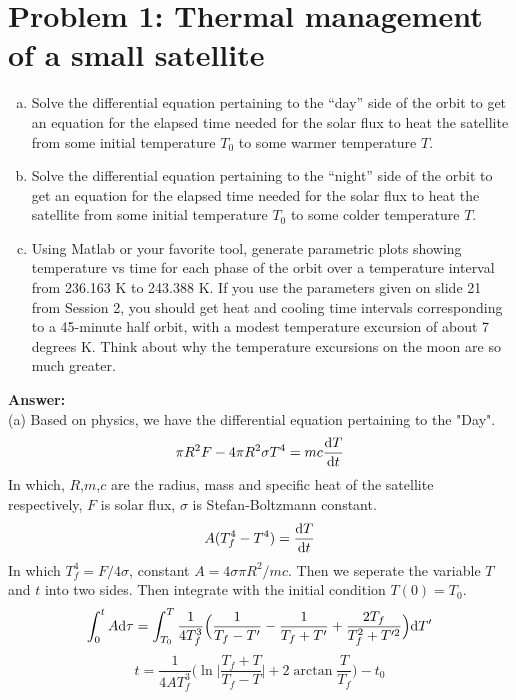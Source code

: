 \documentclass[a4paper]{article}
\begin{document}
\section{Problem 1: Thermal management of a small satellite}
\begin{enumerate}[(a)]
\item Solve the differential equation pertaining to the “day” side of the orbit to get an equation for the elapsed time needed for the solar flux to heat the satellite from some initial temperature $T_0$ to some warmer temperature $T$. 
\item Solve the differential equation pertaining to the “night” side of the orbit to get an equation for the elapsed time needed for the solar flux to heat the satellite from some initial temperature $T_0$ to some colder temperature $T$.   
\item Using Matlab or your favorite tool,  generate parametric plots showing temperature vs time for each phase of the orbit over a temperature interval from 236.163 K to 243.388 K.   If you use the parameters given on slide 21 from Session 2, you should get heat and cooling time intervals corresponding to a 45-minute half orbit, with a modest temperature excursion of about 7 degrees K.   Think about why the temperature excursions on the moon are so much greater.
\end{enumerate}
{\bf Answer: }\\
(a) Based on physics, we have the differential equation pertaining to the "Day".
\begin{equation}
\pi R^2 F -4\pi R^2\sigma T^4 = mc\frac{{\rm d}T}{{\rm d}t}
\end{equation}
In which, $R$,$m$,$c$ are the radius, mass and specific heat of the satellite respectively, $F$ is solar flux, $\sigma$ is Stefan-Boltzmann constant.\\  
\begin{equation}
A (T_f^4 - T^4) = \frac{{\rm d}T}{{\rm d}t}
\end{equation}
In which $T_f^4 = F/4\sigma$, constant $A = 4\sigma \pi R^2/mc$. Then we seperate the variable $T$ and $t$ into two sides. Then integrate with the initial condition $T(0) = T_0$.
\begin{equation}
\int^t_0 A{\rm d}\tau = \int^T_{T_0} \frac{1}{4T^3_f}\Big(\frac{1}{T_f - T'} -\frac{1}{T_f + T'}+\frac{2T_f}{T^2_f+T'^2}\Big){\rm d}T'
\end{equation}
\begin{equation}
t = \frac{1}{4AT_f^3}\Big(\ln \Big|\frac{T_f+T}{T_f-T}\Big|+2\arctan \frac{T}{T_f}\Big)-t_0
\end{equation}
\end{document}
